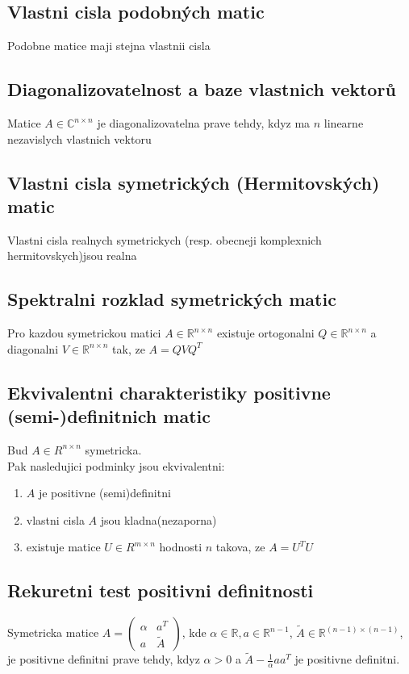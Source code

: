 \documentclass[a4paper]{article}
\begin{document}
\subsection*{Vlastni cisla podobných matic}
Podobne matice maji stejna vlastnii cisla


\subsection*{Diagonalizovatelnost a baze vlastnich vektorů}
Matice $A \in \mathbb{C}^{n\times n}$
je diagonalizovatelna prave tehdy,
kdyz ma $n$ linearne nezavislych vlastnich vektoru


\subsection*{Vlastni cisla symetrických (Hermitovských) matic}
Vlastni cisla realnych symetrickych (resp. obecneji komplexnich hermitovskych)jsou realna


\subsection*{Spektralni rozklad symetrických matic}
Pro kazdou symetrickou matici $A \in \mathbb{R}^{n\times n}$
existuje ortogonalni $Q \in \mathbb{R}^{n\times n}$ a diagonalni
$V \in \mathbb{R}^{n\times n}$
tak, ze $A = QVQ^T$


\subsection*{Ekvivalentni charakteristiky positivne (semi-)definitnich matic}
Bud $A \in R^{n\times n}$ symetricka.\\
Pak nasledujici podminky jsou ekvivalentni:
\begin{enumerate}
	\item $A$ je positivne (semi)definitni
	\item vlastni cisla $A$ jsou kladna(nezaporna)
	\item existuje matice $U \in R^{m\times n}$ hodnosti $n$ takova, ze $A = U^TU$
\end{enumerate}


\subsection*{Rekuretni test positivni definitnosti}
Symetricka matice 
$A = 
\begin{pmatrix} 
	\alpha     & a^T\\ 
	a & \tilde{A}
\end{pmatrix}
$, kde
$\alpha \in \mathbb{R}, a \in \mathbb{R}^{n-1}$,
$\tilde{A} \in \mathbb{R}^{(n-1)\times(n-1)}$,
je positivne definitni prave tehdy, kdyz
$\alpha > 0$ a $\tilde{A} - \frac{1}{\alpha}aa^T$
je positivne definitni.
\end{document}
